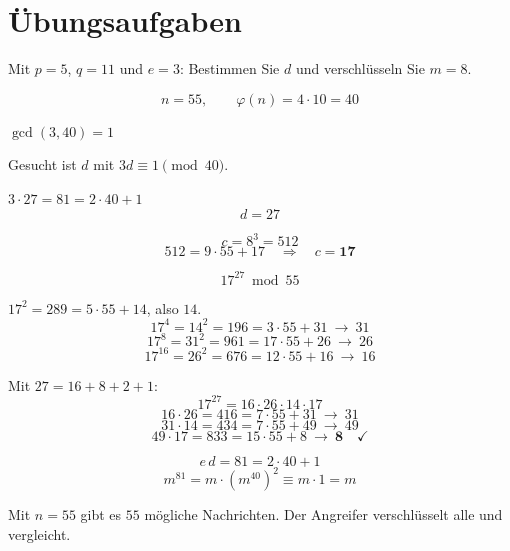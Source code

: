 \section{Übungsaufgaben}

\begin{aufgabe}
Mit $p = 5$, $q = 11$ und $e = 3$: Bestimmen Sie $d$ und verschlüsseln Sie $m = 8$.

\loesung
{}
\[ n = 55, \qquad \varphi(n) = 4\cdot10 = 40 \]

 $\gcd(3,40) = 1$ \checkmark

Gesucht ist $d$ mit $3d \equiv 1 \pmod{40}$.

 $3\cdot27 = 81 = 2\cdot40+1$ \checkmark
\[ d = 27 \]

\[ c = 8^{3} = 512 \]
\[ 512 = 9\cdot55 + 17 \quad\Longrightarrow\quad c = \mathbf{17} \]

\[ 17^{27} \bmod 55 \]

 $17^2 = 289 = 5\cdot55+14$, also $14$.
\[ 17^{4} = 14^{2} = 196 = 3\cdot55+31 \ \to\ 31 \]
\[ 17^{8} = 31^{2} = 961 = 17\cdot55+26 \ \to\ 26 \]
\[ 17^{16} = 26^{2} = 676 = 12\cdot55+16 \ \to\ 16 \]

Mit $27 = 16+8+2+1$:
\[ 17^{27} = 16\cdot26\cdot14\cdot17 \]
\[ 16\cdot26 = 416 = 7\cdot55+31 \ \to\ 31 \]
\[ 31\cdot14 = 434 = 7\cdot55+49 \ \to\ 49 \]
\[ 49\cdot17 = 833 = 15\cdot55+8 \ \to\ \mathbf{8} \quad \checkmark \]

\[ e\,d = 81 = 2\cdot40+1 \]
\[ m^{81} = m\cdot(m^{40})^{2} \equiv m\cdot1 = m \]

\begin{center}
\begin{minipage}{0.86\textwidth}
\end{minipage}
\end{center}

Mit $n = 55$ gibt es $55$ mögliche Nachrichten. Der Angreifer verschlüsselt alle und vergleicht.

\begin{center}
\begin{minipage}{0.88\textwidth}
\end{minipage}
\end{center}
\end{aufgabe}

